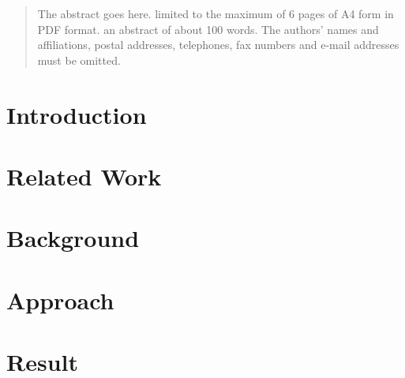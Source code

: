 \documentclass[conference]{IEEEtran}
\begin{document}
\begin{abstract}
The abstract goes here. limited to the maximum of 6 pages of A4 form in PDF format. an abstract of about 100 words. The authors’ names and affiliations, postal addresses, telephones, fax numbers and e-mail addresses must be omitted.
\end{abstract}





%
\IEEEpeerreviewmaketitle



\section{Introduction}
%



\section{Related Work}\label{Related Work}
%



\section{Background}\label{Background}
%



\section{Approach}\label{Approach}
%



\section{Result}\label{Result}

%
\end{document}
